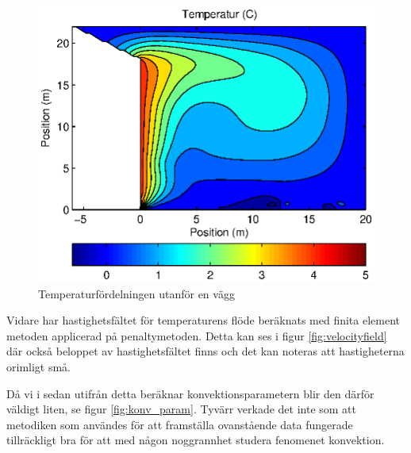 \begin{figure}[hpbt]
\centering
\includegraphics{images/convectemperature.eps}
\caption{\label{fig:temp_dist}Temperaturfördelningen utanför en vägg}
\end{figure}


Vidare har hastighetsfältet för temperaturens flöde beräknats med finita element metoden applicerad på penaltymetoden. Detta kan ses i figur \ref{fig:velocityfield} där också beloppet av hastighetsfältet finns och det kan noteras att hastigheterna orimligt små.

Då vi i sedan utifrån detta beräknar konvektionsparametern blir den därför väldigt liten, se figur \ref{fig:konv_param}. Tyvärr verkade det inte som att metodiken som användes för att framställa ovanstående 
data fungerade tillräckligt bra för att med någon noggrannhet studera fenomenet 
konvektion. 


